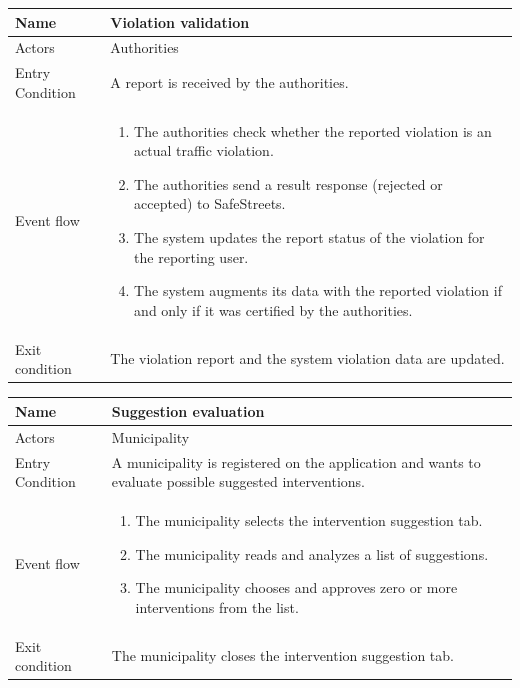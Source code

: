 \vskip 0.2in
\begin{tabular}{|p{3.1cm}|p{11.6cm}|}
\hline
Name & Violation validation\\
\hline
Actors & Authorities\\
\hline
Entry Condition & A report is received by the authorities.\\
\hline
Event flow & \begin{enumerate}
                \item The authorities check whether the reported violation is an actual traffic violation.
                \item The authorities send a result response (rejected or accepted) to SafeStreets.
                \item The system updates the report status of the violation for the reporting user.
                \item The system augments its data with the reported violation if and only if it was certified by the authorities.
            \end{enumerate}\\
\hline
Exit condition & The violation report and the system violation data are updated.\\
\hline
\end{tabular}

\vskip 0.2in
\begin{tabular}{|p{3.1cm}|p{11.6cm}|}
\hline
Name & Suggestion evaluation\\
\hline
Actors & Municipality\\
\hline
Entry Condition & A municipality is registered on the application and wants to evaluate possible suggested interventions.\\
\hline
Event flow & \begin{enumerate}
			\item The municipality selects the intervention suggestion tab.
			\item The municipality reads and analyzes a list of suggestions.
			\item The municipality chooses and approves zero or more interventions from the list.
            \end{enumerate}\\
\hline
Exit condition & The municipality closes the intervention suggestion tab.\\
\hline
\end{tabular}

